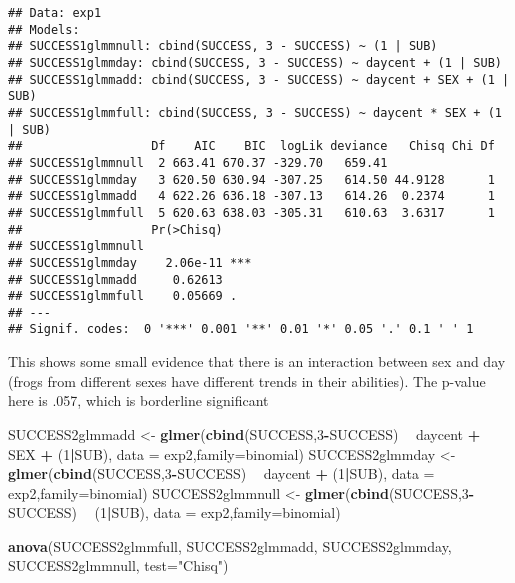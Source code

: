 \documentclass[]{article}
\newenvironment{Shaded}{\begin{snugshade}}{\end{snugshade}}
\newcommand{\KeywordTok}[1]{\textcolor[rgb]{0.13,0.29,0.53}{\textbf{#1}}}
\newcommand{\DataTypeTok}[1]{\textcolor[rgb]{0.13,0.29,0.53}{#1}}
\newcommand{\DecValTok}[1]{\textcolor[rgb]{0.00,0.00,0.81}{#1}}
\newcommand{\StringTok}[1]{\textcolor[rgb]{0.31,0.60,0.02}{#1}}
\newcommand{\OperatorTok}[1]{\textcolor[rgb]{0.81,0.36,0.00}{\textbf{#1}}}
\newcommand{\NormalTok}[1]{#1}
\begin{document}
\begin{verbatim}
## Data: exp1
## Models:
## SUCCESS1glmmnull: cbind(SUCCESS, 3 - SUCCESS) ~ (1 | SUB)
## SUCCESS1glmmday: cbind(SUCCESS, 3 - SUCCESS) ~ daycent + (1 | SUB)
## SUCCESS1glmmadd: cbind(SUCCESS, 3 - SUCCESS) ~ daycent + SEX + (1 | SUB)
## SUCCESS1glmmfull: cbind(SUCCESS, 3 - SUCCESS) ~ daycent * SEX + (1 | SUB)
##                  Df    AIC    BIC  logLik deviance   Chisq Chi Df
## SUCCESS1glmmnull  2 663.41 670.37 -329.70   659.41               
## SUCCESS1glmmday   3 620.50 630.94 -307.25   614.50 44.9128      1
## SUCCESS1glmmadd   4 622.26 636.18 -307.13   614.26  0.2374      1
## SUCCESS1glmmfull  5 620.63 638.03 -305.31   610.63  3.6317      1
##                  Pr(>Chisq)    
## SUCCESS1glmmnull               
## SUCCESS1glmmday    2.06e-11 ***
## SUCCESS1glmmadd     0.62613    
## SUCCESS1glmmfull    0.05669 .  
## ---
## Signif. codes:  0 '***' 0.001 '**' 0.01 '*' 0.05 '.' 0.1 ' ' 1
\end{verbatim}

This shows some small evidence that there is an interaction between sex
and day (frogs from different sexes have different trends in their
abilities). The p-value here is .057, which is borderline significant

\begin{Shaded}
\begin{Highlighting}[]
\NormalTok{SUCCESS2glmmadd <-}\StringTok{ }\KeywordTok{glmer}\NormalTok{(}\KeywordTok{cbind}\NormalTok{(SUCCESS,}\DecValTok{3}\OperatorTok{-}\NormalTok{SUCCESS) }\OperatorTok{~}\StringTok{ }\NormalTok{daycent }\OperatorTok{+}\StringTok{ }\NormalTok{SEX }\OperatorTok{+}\StringTok{ }\NormalTok{(}\DecValTok{1}\OperatorTok{|}\NormalTok{SUB), }\DataTypeTok{data =}\NormalTok{ exp2,}\DataTypeTok{family=}\NormalTok{binomial)}
\NormalTok{SUCCESS2glmmday <-}\StringTok{ }\KeywordTok{glmer}\NormalTok{(}\KeywordTok{cbind}\NormalTok{(SUCCESS,}\DecValTok{3}\OperatorTok{-}\NormalTok{SUCCESS) }\OperatorTok{~}\StringTok{ }\NormalTok{daycent }\OperatorTok{+}\StringTok{ }\NormalTok{(}\DecValTok{1}\OperatorTok{|}\NormalTok{SUB), }\DataTypeTok{data =}\NormalTok{ exp2,}\DataTypeTok{family=}\NormalTok{binomial)}
\NormalTok{SUCCESS2glmmnull <-}\StringTok{ }\KeywordTok{glmer}\NormalTok{(}\KeywordTok{cbind}\NormalTok{(SUCCESS,}\DecValTok{3}\OperatorTok{-}\NormalTok{SUCCESS) }\OperatorTok{~}\StringTok{ }\NormalTok{(}\DecValTok{1}\OperatorTok{|}\NormalTok{SUB), }\DataTypeTok{data =}\NormalTok{ exp2,}\DataTypeTok{family=}\NormalTok{binomial)}

\KeywordTok{anova}\NormalTok{(SUCCESS2glmmfull, SUCCESS2glmmadd, SUCCESS2glmmday, SUCCESS2glmmnull, }\DataTypeTok{test=}\StringTok{"Chisq"}\NormalTok{)}
\end{Highlighting}
\end{Shaded}
\end{document}
